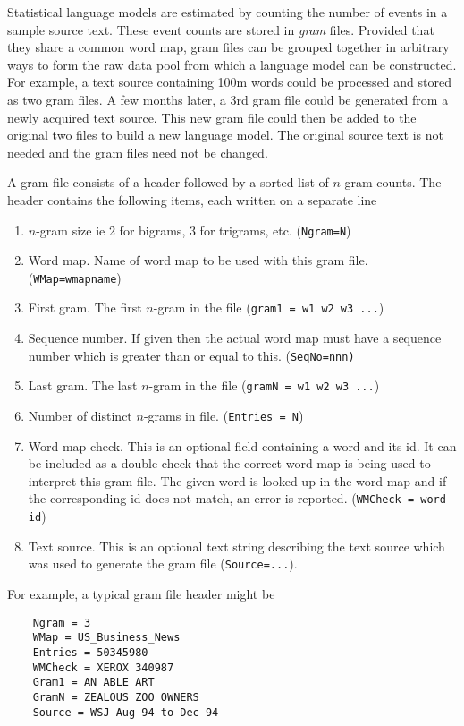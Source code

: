 
Statistical language models are estimated by counting the number of
events in a sample source text.  These event counts are stored in
\textit{gram} files.  Provided that they share a common word map, gram
files can be grouped together in arbitrary ways to form the raw data
pool from which a language model can be constructed.  For example, a
text source containing 100m words could be processed and stored as two
gram files. A few months later, a 3rd gram file could be generated
from a newly acquired text source.  This new gram file could then be
added to the original two files to build a new language model.  The
original source text is not needed and the gram files need not be
changed. 

A gram file consists of a header followed by a
sorted list of $n$-gram counts. The header
contains the following items, each written on a separate line
\begin{enumerate}

\item $n$-gram size ie 2 for bigrams, 3 for trigrams, etc. (\texttt{Ngram=N})

\item Word map.  Name of word map to be used with this gram 
      file. (\texttt{WMap=wmapname})

\item First gram.  The first $n$-gram in the file (\texttt{gram1 = w1 w2 w3 ...})

\item Sequence number.  If given then the actual word map must have a sequence
      number which is greater than or equal to this.
      (\texttt{SeqNo=nnn)}

\item Last gram. The last $n$-gram in the file (\texttt{gramN = w1 w2 w3 ...})

\item Number of distinct $n$-grams in file.  (\texttt{Entries = N}) 

\item Word map check.  This is an optional field containing a word and its id.
      It can be included as a double check that the correct word map
      is being used to interpret this gram file.  The given word is
      looked up in the word map and if the corresponding id does not
      match, an error is reported.  (\texttt{WMCheck = word id})

\item Text source.  This is an optional text string describing the text source 
      which was used to generate the gram file (\texttt{Source=...}).

\end{enumerate}
For example, a typical gram file header might be
\begin{verbatim}
    Ngram = 3
    WMap = US_Business_News
    Entries = 50345980
    WMCheck = XEROX 340987
    Gram1 = AN ABLE ART
    GramN = ZEALOUS ZOO OWNERS
    Source = WSJ Aug 94 to Dec 94
\end{verbatim}


